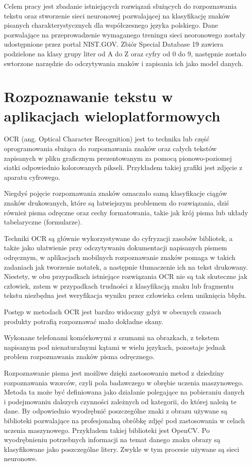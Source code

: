 \documentclass[brudnopis]{xmgr}
\begin{document}
  Celem pracy jest  zbadanie istniejących rozwiązań służących do rozpoznawania tekstu oraz stworzenie sieci neuronowej pozwalającej na klasyfikację znaków pisanych charakterystycznych dla współczesnego języka polskiego. Dane pozwalające na przeprowadzenie wymaganego treningu sieci neoronowego zostały udostępnione przez portal NIST.GOV. Zbiór Special Database 19 zawiera podzielone na klasy grupy liter od A do Z oraz cyfry od 0 do 9, następnie zostało swtorzone narzędzie do odczytywania znaków i zapisania ich jako model danych.

\chapter{Rozpoznawanie tekstu w aplikacjach wieloplatformowych}

OCR (ang. Optical Character Recognition) jest to technika lub część oprogramowania służąca do rozpoznawania znaków oraz całych tekstów zapisanych w pliku graficznym prezentowanym za pomocą pionowo-poziomej siatki odpowiednio kolorowanych pikseli. Przykładem takiej grafiki jest zdjęcie z aparatu cyfrowego. 

Niegdyś pojęcie rozpoznawania znaków oznaczało samą klasyfikacje ciągów znaków drukowanych, które są łatwiejszym problemem do rozwiązania, dziś również pisma odręczne oraz cechy formatowania, takie jak krój pisma lub układy tabelaryczne (formularze).

Techniki OCR są głównie wykorzystywane do cyfryzacji zasobów bibliotek, a także jako ułatwienie przy odczytywaniu dokumentacji napisanych pismem odręcznym, w aplikacjach mobilnych rozpoznawanie znaków pomaga w takich zadaniach jak tworzenie notatek, a następnie tłumaczenie ich na tekst drukowany. Niestety, w obu przypadkach istniejące rozwiązania OCR nie są tak skuteczne jak człowiek, zatem w przypadkach trudności z klasyfikacją znaku lub fragmentu tekstu niezbędna jest weryfikacja wyniku przez człowieka celem uniknięcia błędu.

Postęp w metodach OCR jest bardzo widoczny gdyż w obecnych czasach produkty potrafią rozpoznawać mało dokładne skany.

Wykonane telefonami komórkowymi z szumami na obrazkach, z tekstem napisanym pod nienaturalnymi kątami w wielu językach, pozostaje jednak problem rozpoznawania znaków pisma odręcznego.

Rozpoznawanie pisma jest możliwe dzięki zastosowaniu metod z dziedziny rozpoznawania wzorców, czyli pola badawczego w obrębie uczenia maszynowego. Metoda ta może być definiowana jako działanie polegające na pobieraniu danych i podejmowaniu dalszych czynności zależnych od kategorii, do której należą te dane. By odpowiednio wyodrębnić poszczególne znaki z obrazu używane są biblioteki pozwalające na profesjonalną obróbkę zdjęć pod zastosowania w celach uczenia maszynowego. Przykładem takiej biblioteki jest OpenCV. Po wyodrębnieniu potrzebnych informacji na temat danego znaku obrazy są klasyfikowane jako poszczególne litery. Zwykle w tym procesie używane są sieci neuronowe.
\end{document}
